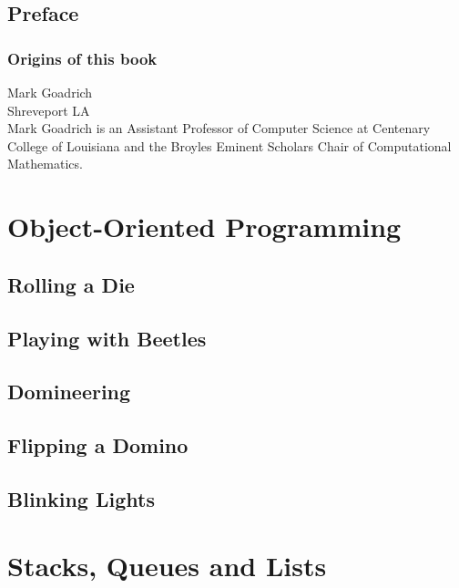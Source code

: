\documentclass[10pt]{book}
\begin{document}
\chapter{Preface}

\section*{Origins of this book}

Mark Goadrich\\
Shreveport LA\\

Mark Goadrich is an Assistant Professor of Computer Science
at Centenary College of Louisiana and the Broyles Eminent Scholars 
Chair of Computational Mathematics.


\normalsize

\clearemptydoublepage

\begin{latexonly}

\tableofcontents

\clearemptydoublepage

\end{latexonly}

\mainmatter

\part{Object-Oriented Programming}

\chapter{Rolling a Die}

\chapter{Playing with Beetles}

\chapter{Domineering}

\chapter{Flipping a Domino}

\chapter{Blinking Lights}

\part{Stacks, Queues and Lists}
\end{document}
